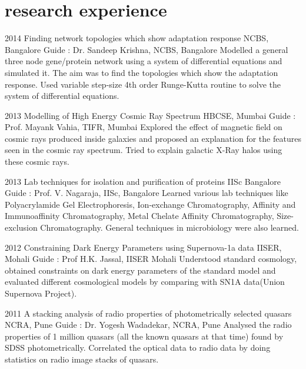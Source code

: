 \documentclass[11pt]{friggeri-cv}
\begin{document}
\section{research experience}
\begin{entrylist}
  \entry
    {2014}
    {Finding network topologies which show adaptation response}
    {NCBS, Bangalore}
    {Guide : Dr. Sandeep Krishna, NCBS, Bangalore}
    {Modelled a general three node gene/protein network using a system of differential equations and simulated it. The aim was to find the topologies which show the adaptation response. Used variable step-size 4th order Runge-Kutta routine to solve the system of differential equations.}
\end{entrylist}
\begin{entrylist}

  \entry
    {2013}
    {Modelling of High Energy Cosmic Ray Spectrum}
    {HBCSE, Mumbai}
    {Guide : Prof. Mayank Vahia, TIFR, Mumbai}
    {Explored the effect of magnetic field on cosmic rays produced inside galaxies and proposed an explanation for the features seen in the cosmic ray spectrum. Tried to explain galactic X-Ray halos using these cosmic rays. 
    }
\end{entrylist}
\begin{entrylist}
    
  \entry
    {2013}
    {Lab techniques for isolation and purification of proteins}
    {IISc Bangalore}
    {
    Guide : Prof. V. Nagaraja, IISc, Bangalore}
    {Learned various lab techniques like Polyacrylamide Gel Electrophoresis, Ion-exchange Chromatography, Affinity and Immunoaffinity Chromatography, Metal Chelate Affinity Chromatography,  Size-exclusion Chromatography. General techniques in microbiology were also learned.
    }    
\end{entrylist}
\begin{entrylist}

  \entry
    {2012}
    {Constraining Dark Energy Parameters using Supernova-1a data}
    {IISER, Mohali}
    {Guide : Prof H.K. Jassal, IISER Mohali}
    {Understood standard cosmology,  obtained constraints on dark energy parameters of the standard model and evaluated different cosmological models by comparing with SN1A data(Union Supernova Project).     }
    
\end{entrylist}
    \begin{entrylist}


  \entry
    {2011}
    {A stacking analysis of radio properties of photometrically selected quasars}
    {NCRA, Pune}
    {
    Guide : Dr. Yogesh Wadadekar, NCRA, Pune}
    {Analysed the radio properties of 1 million quasars (all the known quasars at that time) found by SDSS photometrically. Correlated the optical data to radio data by doing statistics on radio image stacks of quasars.}
    \end{entrylist}
\end{document}
